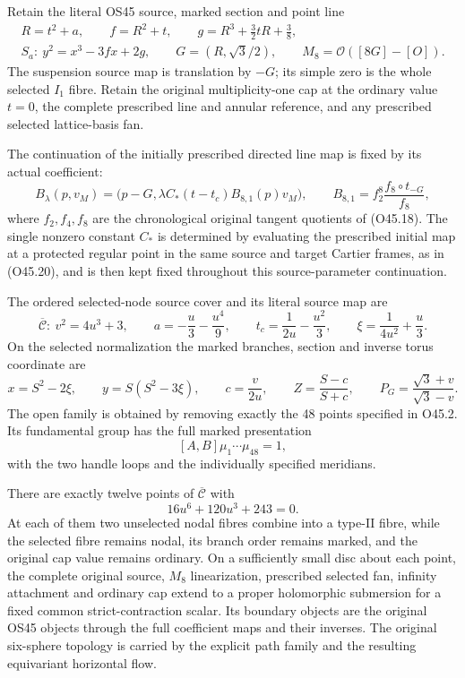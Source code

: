 \begin{theorem}\label{night:P3K.116}
Retain the literal OS45 source, marked section and point line
\[
\begin{gathered}
 R=t^2+a,\qquad f=R^2+t,\qquad
 g=R^3+\frac32tR+\frac38,\\
 S_a:\ y^2=x^3-3fx+2g,\qquad
 G=(R,\sqrt3/2),\qquad M_8=\mathcal O([8G]-[O]).
\end{gathered}
\]
The suspension source map is translation by \(-G\); its simple zero is
the whole selected \(I_1\) fibre. Retain the original multiplicity-one
cap at the ordinary value \(t=0\), the complete prescribed line and
annular reference, and any prescribed selected lattice-basis fan.

The continuation of the initially prescribed directed line map is
fixed by its actual coefficient:
\[
 B_\lambda(p,v_M)=
 \bigl(p-G,\lambda C_*(t-t_c)B_{8,1}(p)v_M\bigr),\qquad
 B_{8,1}=f_2^8\frac{f_8\circ t_{-G}}{f_8},
\]
where $f_2,f_4,f_8$ are the chronological original tangent quotients
of (O45.18).  The single nonzero constant $C_*$ is determined by
evaluating the prescribed initial map at a protected regular point
in the same source and target Cartier frames, as in (O45.20), and
is then kept fixed throughout this source-parameter continuation.

The ordered selected-node source cover and its literal source map are
\[
\overline{\mathcal C}:\ v^2=4u^3+3,\qquad
a=-\frac u3-\frac{u^4}{9},\qquad
t_c=\frac1{2u}-\frac{u^2}{3},\qquad
\xi=\frac1{4u^2}+\frac u3.
\]
On the selected normalization the marked branches, section and inverse
torus coordinate are
\[
x=S^2-2\xi,\qquad y=S(S^2-3\xi),\qquad
c=\frac v{2u},\qquad
Z=\frac{S-c}{S+c},\qquad
P_G=\frac{\sqrt3+v}{\sqrt3-v}.
\]
The open family is obtained by removing exactly the 48 points specified
in O45.2. Its fundamental group has the full marked presentation
\[
[A,B]\mu_1\cdots\mu_{48}=1,
\]
with the two handle loops and the individually specified meridians.

There are exactly twelve points of \(\overline{\mathcal C}\) with
\[
16u^6+120u^3+243=0.
\]
At each of them two unselected nodal fibres combine into a type-II
fibre, while the selected fibre remains nodal, its branch order remains
marked, and the original cap value remains ordinary. On a sufficiently
small disc about each point, the complete original source, \(M_8\)
linearization, prescribed selected fan, infinity attachment and
ordinary cap extend to a proper holomorphic submersion for a fixed
common strict-contraction scalar. Its boundary objects are the original
OS45 objects through the full coefficient maps and their inverses.
The original six-sphere topology is carried by the explicit path family
and the resulting equivariant horizontal flow.


\end{theorem}
